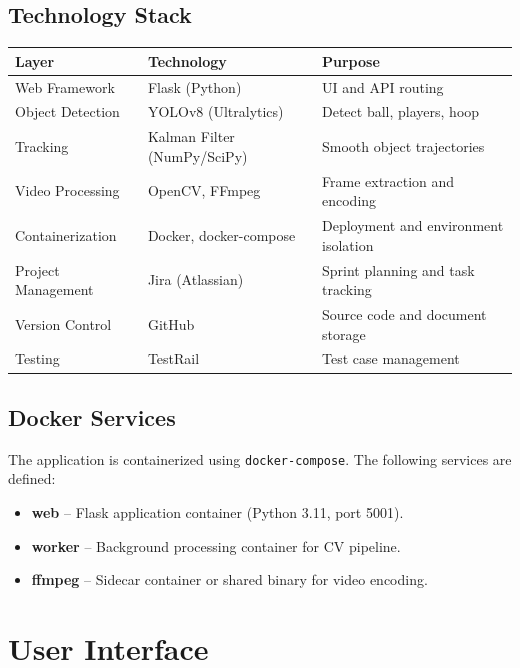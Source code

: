 \documentclass[12pt]{article}
\begin{document}
\subsection{Technology Stack}

\begin{tabularx}{\textwidth}{|l|l|X|}
    \hline
    \textbf{Layer} & \textbf{Technology} & \textbf{Purpose} \\
    \hline
    Web Framework  & Flask (Python)      & UI and API routing \\
    \hline
    Object Detection & YOLOv8 (Ultralytics) & Detect ball, players, hoop \\
    \hline
    Tracking       & Kalman Filter (NumPy/SciPy) & Smooth object trajectories \\
    \hline
    Video Processing & OpenCV, FFmpeg    & Frame extraction and encoding \\
    \hline
    Containerization & Docker, docker-compose & Deployment and environment isolation \\
    \hline
    Project Management & Jira (Atlassian) & Sprint planning and task tracking \\
    \hline
    Version Control & GitHub            & Source code and document storage \\
    \hline
    Testing        & TestRail           & Test case management \\
    \hline
\end{tabularx}

\subsection{Docker Services}
The application is containerized using \texttt{docker-compose}. The following
services are defined:

\begin{itemize}[noitemsep]
    \item \textbf{web} -- Flask application container (Python 3.11, port 5001).
    \item \textbf{worker} -- Background processing container for CV pipeline.
    \item \textbf{ffmpeg} -- Sidecar container or shared binary for video encoding.
\end{itemize}

\newpage

\section{User Interface}
\end{document}
